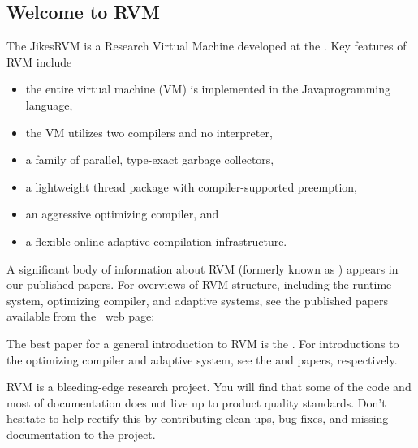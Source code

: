 \subsection {Welcome to RVM}

The Jikes\trademark RVM is a Research Virtual Machine 
 developed at the 
.  Key
features of RVM include
\begin{itemize}
\item the entire virtual machine (VM) is implemented in the
  Java\trademark  programming language,
\item the VM utilizes two compilers and no interpreter,
\item a family of parallel, type-exact garbage collectors,
\item a lightweight thread package with compiler-supported preemption,
\item an aggressive optimizing compiler, and 
\item a flexible online adaptive compilation infrastructure.
\end{itemize}

A significant body of information about RVM 
(formerly known as 
\xlink{\jp}{\JalapenoHomeURL}) appears 
in our published
papers.  For overviews of RVM structure, including the runtime system,
optimizing compiler, and adaptive systems, see the published papers
available from the \jp\ web page:
\begin{quote}
\xlink{{\RVMPubsURL}}{\RVMPubsURL}
\end{quote}

The best paper for a general introduction to RVM is 
the 
.  
For introductions to the
optimizing compiler and adaptive system, see the 
{\JavaGrandePaperURL}
 and 
{\OOPSLAPaperURL}  
papers, respectively.

RVM is a bleeding-edge research project.  You will find that
some of the code and most of documentation does not live up to product  
quality standards. Don't hesitate to help rectify this by
contributing clean-ups, bug fixes, and missing documentation to 
the project.  

